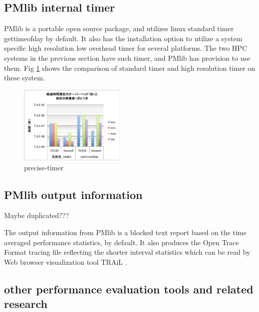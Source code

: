 \documentclass[conference]{IEEEtran}
\begin{document}







\subsection{PMlib internal timer}
PMlib is a portable open source package, and utilizes linux standard timer
gettimeofday by default. It also has the installation option to utilize
a system specific high resolution low overhead timer for several platforms.
The two HPC systems in the previous section have such timer, and PMlib has
provision to use them.
Fig \ref{fig:precise-timer} shows the comparison of standard timer and
high resolution timer on these system.


\begin{figure}[bt]
\centering
\includegraphics[width=0.45\textwidth]{figs/precise-timer.pdf}
\caption{precise-timer}
\label{fig:precise-timer}
\end{figure}



\subsection{PMlib output information}

{\color{blue} Maybe duplicated???}

The output information from PMlib is a blocked text report based on
the time averaged performance statistics, by default.
It also produces the Open Trace Format \cite{} tracing file reflecting
the shorter interval statistics which can be read by Web browser
visualization tool TRAiL \cite{}.


\subsection{other performance evaluation tools and related research}
\end{document}
